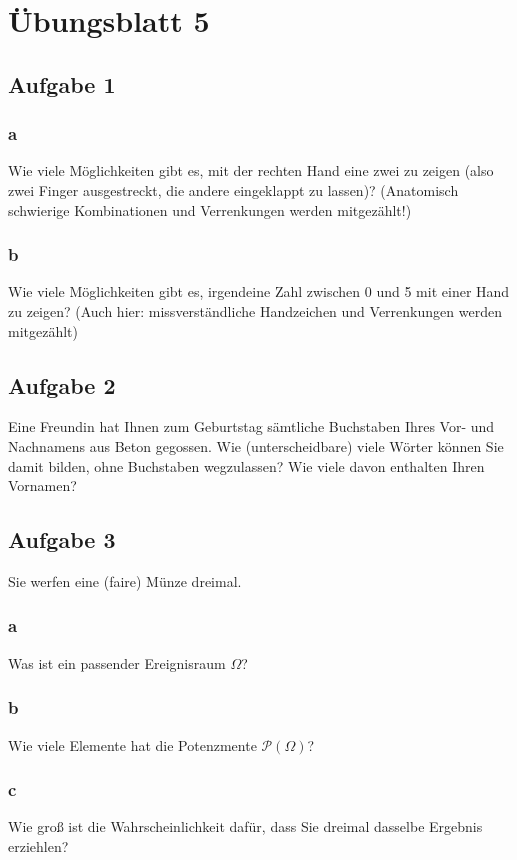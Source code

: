 \chapter{Übungsblatt 5}

\section{Aufgabe 1}

\subsection{a} 
Wie viele Möglichkeiten gibt es, mit der rechten Hand eine zwei zu zeigen (also zwei Finger ausgestreckt, die andere eingeklappt zu lassen)? (Anatomisch schwierige Kombinationen und Verrenkungen werden mitgezählt!)

\subsection{b}
Wie viele Möglichkeiten gibt es, irgendeine Zahl zwischen 0 und 5 mit einer Hand zu zeigen? (Auch hier: missverständliche Handzeichen und Verrenkungen werden mitgezählt)

\section{Aufgabe 2}
Eine Freundin hat Ihnen zum Geburtstag sämtliche Buchstaben Ihres Vor- und Nachnamens aus Beton gegossen. Wie (unterscheidbare) viele Wörter können Sie damit bilden, ohne Buchstaben wegzulassen? Wie viele davon enthalten Ihren Vornamen?

\section{Aufgabe 3}
Sie werfen eine (faire) Münze dreimal.

\subsection{a}
Was ist ein passender Ereignisraum $\Omega$?

\subsection{b}
Wie viele Elemente hat die Potenzmente $\mathcal{P}(\Omega)$?

\subsection{c}
Wie groß ist die Wahrscheinlichkeit dafür, dass Sie dreimal dasselbe Ergebnis erziehlen?